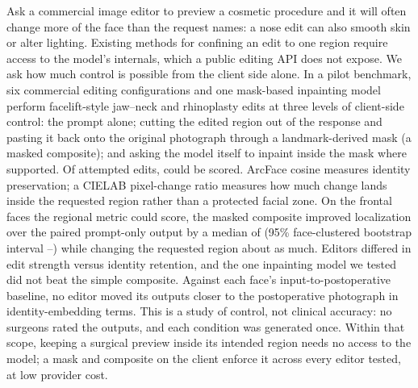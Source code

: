 Ask a commercial image editor to preview a cosmetic procedure and it will often
change more of the face than the request names: a nose edit can also smooth skin
or alter lighting. Existing methods for confining an edit to one region require
access to the model's internals, which a public editing API does not expose. We
ask how much control is possible from the client side alone. In a pilot
benchmark, six commercial editing configurations and one mask-based inpainting
model perform facelift-style jaw--neck and rhinoplasty edits at three levels of
client-side control: the prompt alone; cutting the edited region out of the
response and pasting it back onto the original photograph through a
landmark-derived mask (a masked composite); and asking the model itself to
inpaint inside the mask where supported. Of \NumAttemptedEdits{} attempted
edits, \NumScoredEdits{} could be scored. ArcFace cosine measures identity
preservation; a CIELAB pixel-change ratio measures how much change lands inside
the requested region rather than a protected facial zone. On the
\NumLocalizationFaces{} frontal faces the regional metric could score, the
masked composite improved localization over the paired prompt-only output by a
median of \MedPairedLocGain{} (95\% face-clustered bootstrap interval
\PairedLocGainLow--\PairedLocGainHigh) while changing the requested region about
as much. Editors differed in edit strength versus identity retention, and the
one inpainting model we tested did not beat the simple composite. Against each
face's input-to-postoperative baseline, no editor moved its outputs closer to
the postoperative photograph in identity-embedding terms. This is a study of
control, not clinical accuracy: no surgeons rated the outputs, and each
condition was generated once. Within that scope, keeping a surgical preview
inside its intended region needs no access to the model; a mask and composite on
the client enforce it across every editor tested, at low provider cost.
